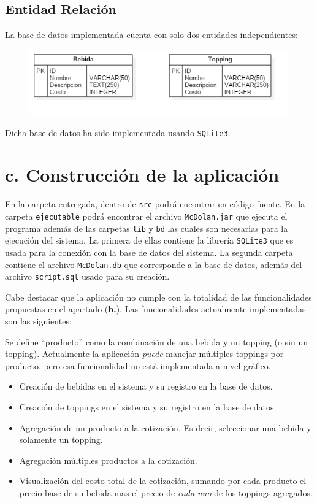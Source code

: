 \documentclass[11pt]{utalcaDoc}
\begin{document}
\subsection*{Entidad Relación}

La base de datos implementada cuenta con solo dos entidades independientes:
\begin{figure}[H]
\includegraphics[scale=0.6]{ER.png}
\end{figure}

Dicha base de datos ha sido implementada usando \texttt{SQLite3}.

\section*{c. Construcción de la aplicación}

En la carpeta entregada, dentro de  \texttt{src} podrá encontrar en código fuente. En la carpeta \texttt{ejecutable} podrá encontrar el archivo \texttt{McDolan.jar} que ejecuta el programa además de las carpetas \texttt{lib} y \texttt{bd} las cuales son necesarias para la ejecución del sistema. La primera de ellas contiene la librería \texttt{SQLite3} que es usada para la conexión con la base de datos del sistema. La segunda carpeta contiene el archivo \texttt{McDolan.db} que corresponde a la base de datos, además del archivo \texttt{script.sql} usado para su creación.

Cabe destacar que la aplicación no cumple con la totalidad de las funcionalidades propuestas en el apartado (\textbf{b.}). Las funcionalidades actualmente implementadas son las siguientes:

Se define ``producto'' como la combinación de una bebida y un topping (o sin un topping). Actualmente la aplicación \textit{puede} manejar múltiples toppings por producto, pero esa funcionalidad no está implementada a nivel gráfico.

\begin{itemize}
\item Creación de bebidas en el sistema y su registro en la base de datos.
\item Creación de toppings en el sistema y su registro en la base de datos.
\item Agregación de un producto a la cotización. Es decir, seleccionar una bebida y solamente un topping.
\item Agregación múltiples productos a la cotización.
\item Visualización del costo total de la cotización, sumando por cada producto el precio base de su bebida mas el precio de \textit{cada uno} de los toppings agregados.
\end{itemize}
\end{document}
